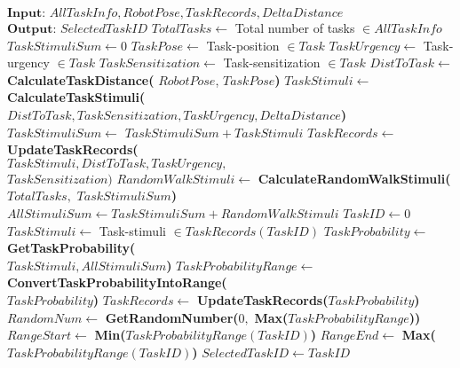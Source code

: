 \documentclass[journal]{IEEEtran}
\begin{document}
\begin{algorithmic}[1]
\begin{small}
\label{alg:task-selector}
\State $\textbf{Input: } AllTaskInfo, RobotPose, TaskRecords, DeltaDistance$
\State $\textbf{Output: } SelectedTaskID$
\State {}
\State $TotalTasks \gets$  Total number of tasks $\in AllTaskInfo$  
\State $ TaskStimuliSum \gets 0 $
\State $ TaskPose \gets  $ Task-position  $ \in Task$
\State $ TaskUrgency \gets $ Task-urgency $ \in Task$
\State $ TaskSensitization \gets $ Task-sensitization $\in Task$
\State $ DistToTask \gets$
\textbf{CalculateTaskDistance(}
\newline
$RobotPose$, $TaskPose$\textbf{)}
\State $ TaskStimuli \gets  $ \textbf{CalculateTaskStimuli(}
\newline
$DistToTask, TaskSensitization, TaskUrgency, DeltaDistance$\textbf{)}
\State $ TaskStimuliSum \gets$  $TaskStimuliSum + TaskStimuli$
\State $ TaskRecords \gets $ \textbf{UpdateTaskRecords(\\}$TaskStimuli,DistToTask, TaskUrgency,$\\ $TaskSensitization\textbf{)}$
\EndFor
\State $RandomWalkStimuli \gets $ \textbf{CalculateRandomWalkStimuli(\\}$TotalTasks,$ %
 $TaskStimuliSum$\textbf{)}
\State $ AllStimuliSum \gets TaskStimuliSum + RandomWalkStimuli $
\State {}
\State $ TaskID \gets 0 $ 
\State $ TaskStimuli \gets $ Task-stimuli $\in TaskRecords(TaskID)$
\State $ TaskProbability \gets  $ \textbf{GetTaskProbability(\\}$TaskStimuli, AllStimuliSum$\textbf{)}
\State $ TaskProbabilityRange \gets $
\newline
 \textbf{ConvertTaskProbabilityIntoRange(}\\ $TaskProbability$\textbf{)}
\State $ TaskRecords \gets  $ \textbf{UpdateTaskRecords(}$TaskProbability$\textbf{)}
\EndWhile
\State {}
\State $ RandomNum \gets  $ 
\newline
\textbf{GetRandomNumber(}$0,$ \textbf{Max(}$TaskProbabilityRange$\textbf{))}
\State $ RangeStart \gets  $ \textbf{Min(}$TaskProbabilityRange (TaskID)$\textbf{)}
\State $ RangeEnd \gets  $ \textbf{Max(}$TaskProbabilityRange (TaskID)$\textbf{)}
\State $ SelectedTaskID \gets TaskID $ 
\EndIf
\EndWhile
\end{small}
\end{algorithmic}
\end{document}
